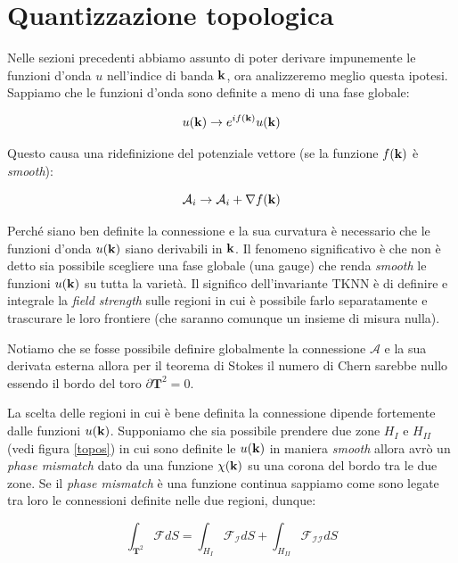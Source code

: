 \documentclass[12pt,a4paper]{article}
\begin{document}
\section{Quantizzazione topologica}
Nelle sezioni precedenti abbiamo assunto di poter derivare impunemente le funzioni d'onda $u$ nell'indice di banda $\bold{k}$, ora analizzeremo meglio questa ipotesi. Sappiamo che le funzioni d'onda sono definite a meno di una fase globale:

\begin{equation}
u(\bold{k}) \rightarrow e^{i f(\bold{k})} u(\bold{k})
\end{equation}

Questo causa una ridefinizione del potenziale vettore (se la funzione $f(\bold{k})$ è \emph{smooth}):

\begin{equation}
\mathcal{A}_i \rightarrow \mathcal{A}_i + \nabla f(\bold{k})
\end{equation}

Perché siano ben definite la connessione e la sua curvatura è necessario che le funzioni d'onda $u(\bold{k})$ siano derivabili in $\bold{k}$. Il fenomeno significativo è che non è detto sia possibile scegliere una fase globale (una gauge) che renda \emph{smooth} le funzioni $u(\bold{k})$ su tutta la varietà. Il significo dell'invariante TKNN è di definire e integrale la \emph{field strength} sulle regioni in cui è possibile farlo separatamente e trascurare le loro frontiere (che saranno comunque un insieme di misura nulla).

Notiamo che se fosse possibile definire globalmente la connessione $\mathcal{A}$ e la sua derivata esterna allora per il teorema di Stokes il numero di Chern sarebbe nullo essendo il bordo del toro $\partial \mathbf{T}^2 = 0$.

La scelta delle regioni in cui è bene definita la connessione dipende fortemente dalle funzioni $u(\bold{k})$. Supponiamo che sia possibile prendere due zone $H_{I}$ e $H_{II}$ (vedi figura \ref{topos}) in cui sono definite le  $u(\bold{k})$ in maniera \emph{smooth} allora avrò un \emph{phase mismatch} dato da una funzione $\chi (\bold{k})$ su una corona del bordo tra le due zone. Se il \emph{phase mismatch} è una funzione continua sappiamo come sono legate tra loro le connessioni definite nelle due regioni, dunque:

\begin{equation}
\int_{\mathbf{T}^2} \mathcal{F} dS = \int_{H_{I}} \mathcal{F_{I}} dS + \int_{H_{II}} \mathcal{F_{II}} dS
\end{equation}
\end{document}
